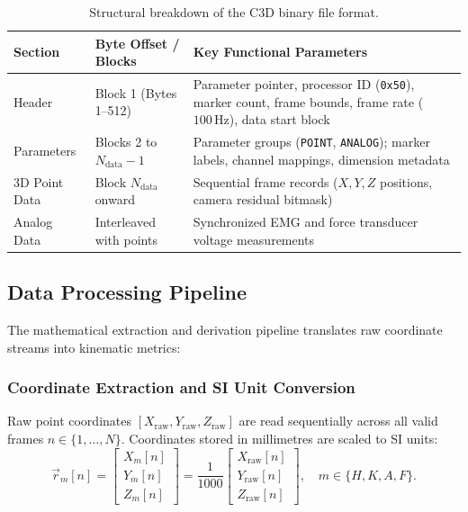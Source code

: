 \documentclass[12pt,a4paper]{article}
\begin{document}
\begin{table}[H]\centering
\caption{Structural breakdown of the C3D binary file format.}
\begin{tabularx}{\textwidth}{llX}
\toprule
\textbf{Section} & \textbf{Byte Offset / Blocks} & \textbf{Key Functional Parameters} \\
\midrule
Header & Block 1 (Bytes 1--512) & Parameter pointer, processor ID (\texttt{0x50}), marker count, frame bounds, frame rate ($100\,\mathrm{Hz}$), data start block \\
Parameters & Blocks 2 to $N_{\text{data}}-1$ & Parameter groups (\texttt{POINT}, \texttt{ANALOG}); marker labels, channel mappings, dimension metadata \\
3D Point Data & Block $N_{\text{data}}$ onward & Sequential frame records ($X, Y, Z$ positions, camera residual bitmask) \\
Analog Data & Interleaved with points & Synchronized EMG and force transducer voltage measurements \\
\bottomrule
\end{tabularx}
\label{tab:c3d-structure}
\end{table}

\subsection{Data Processing Pipeline}
The mathematical extraction and derivation pipeline translates raw coordinate streams into kinematic metrics:

\subsubsection{Coordinate Extraction and SI Unit Conversion}
Raw point coordinates $[X_{\text{raw}}, Y_{\text{raw}}, Z_{\text{raw}}]$ are read sequentially across all valid frames $n \in \{1, \dots, N\}$. Coordinates stored in millimetres are scaled to SI units:
\begin{equation}
\vec{r}_m[n] = \begin{bmatrix} X_m[n] \\ Y_m[n] \\ Z_m[n] \end{bmatrix} = \frac{1}{1000} \begin{bmatrix} X_{\text{raw}}[n] \\ Y_{\text{raw}}[n] \\ Z_{\text{raw}}[n] \end{bmatrix}, \quad m \in \{H, K, A, F\}.
\end{equation}
\end{document}
